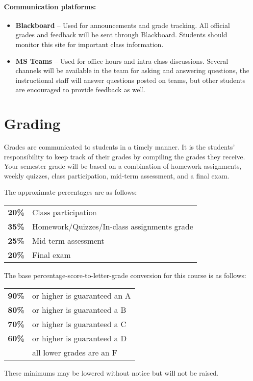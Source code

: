\documentclass[12pt]{scrartcl}
\begin{document}
\paragraph{Communication platforms:}
\begin{itemize}
\item \textbf{Blackboard}  -- Used for announcements and grade tracking. All official grades and feedback will be sent through Blackboard. Students should monitor this site for important class information. 
\item \textbf{MS Teams} -- Used for office hours and intra-class discussions. Several channels will be available in the team for asking and answering questions, the instructional staff will answer questions posted on teams, but other students are encouraged to provide feedback as well. 
\end{itemize}





\section{Grading}

Grades are communicated to students in a timely manner. 
It is the students’ responsibility to keep track of their grades by compiling the grades they receive. 
Your semester grade will be based on a combination of homework assignments, weekly quizzes, class participation,  mid-term assessment, and a final exam. 

The approximate percentages are as follows:
\begin{center}
\begin{tabular}{rl}
\textbf{20\% } & Class participation \\
\textbf{35\% } & Homework/Quizzes/In-class assignments grade\\
\textbf{25\% } & Mid-term assessment\\
\textbf{20\% } & Final exam\\
\end{tabular}
\end{center}
The base percentage-score-to-letter-grade conversion for this course is as follows: 

\begin{center}
\begin{tabular}{rl}
\textbf{90\%}& or higher is guaranteed an A \\
\textbf{80\%}& or higher is guaranteed a B \\
\textbf{70\%}& or higher is guaranteed a C \\
\textbf{60\%}& or higher is guaranteed a D \\
\textbf{}& all lower grades are an F 
\end{tabular}
\end{center}
These minimums may be lowered without notice but will not be raised. 
\end{document}
